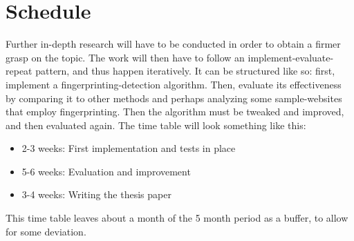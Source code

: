\documentclass[
    fontsize=12pt,
    headings=small,
    parskip=half,
    bibliography=totoc,
    numbers=noenddot,
    open=any
    ]{scrreprt}
\begin{document}

\begingroup
\renewcommand{\cleardoublepage}{}
\renewcommand{\clearpage}{}
\chapter{Schedule} %
\endgroup
Further in-depth research will have to be conducted in order to obtain a firmer grasp on the topic.
The work will then have to follow an implement-evaluate-repeat pattern, and thus happen iteratively.
It can be structured like so: first, implement a fingerprinting-detection algorithm.
Then, evaluate its effectiveness by comparing it to other methods and perhaps analyzing some sample-websites
that employ fingerprinting. Then the algorithm must be tweaked and improved, and then evaluated again.
The time table will look something like this:

\begin{itemize}
    \item
        2-3 weeks: First implementation and tests in place
    \item
        5-6 weeks: Evaluation and improvement
    \item
        3-4 weeks: Writing the thesis paper
\end{itemize}

This time table leaves about a month of the 5 month period as a buffer, to allow for some
deviation.


\clearpage

\printbibliography
\end{document}
